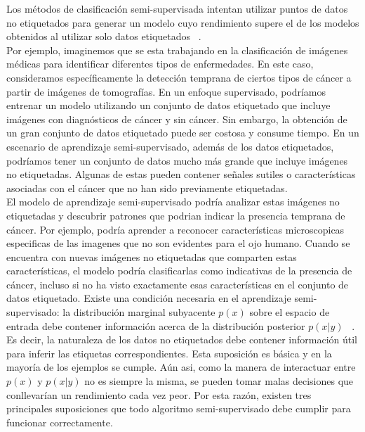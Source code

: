 Los métodos de clasificación semi-supervisada intentan utilizar puntos de datos no etiquetados para generar un modelo cuyo rendimiento supere el de los modelos obtenidos al utilizar solo datos etiquetados ~\cite{Engelen:semi-supervised}. \\Por ejemplo, imaginemos que se esta trabajando en la clasificación de imágenes médicas para identificar diferentes tipos de enfermedades. En este caso, consideramos específicamente la detección temprana de ciertos tipos de cáncer a partir de imágenes de tomografías. En un enfoque supervisado, podríamos entrenar un modelo utilizando un conjunto de datos etiquetado que incluye imágenes con diagnósticos de cáncer y sin cáncer. Sin embargo, la obtención de un gran conjunto de datos etiquetado puede ser costosa y consume tiempo. En un escenario de aprendizaje semi-supervisado, además de los datos etiquetados, podríamos tener un conjunto de datos mucho más grande que incluye imágenes no etiquetadas. Algunas de estas pueden contener señales sutiles o características asociadas con el cáncer que no han sido previamente etiquetadas.\\El modelo de aprendizaje semi-supervisado  podría analizar estas imágenes no etiquetadas y descubrir patrones que podrian indicar la presencia temprana de cáncer. Por ejemplo, podría aprender a reconocer características microscopicas especificas de las imagenes que no son evidentes para el ojo humano. Cuando se encuentra con nuevas imágenes no etiquetadas que comparten estas características, el modelo podría clasificarlas como indicativas de la presencia de cáncer, incluso si no ha visto exactamente esas características en el conjunto de datos etiquetado.
Existe una condición necesaria en el aprendizaje semi-supervisado: la distribución marginal subyacente $p(x)$ sobre el espacio de entrada debe contener información acerca de la distribución posterior $p(x|y)$ ~\cite{Engelen:semi-supervised}. Es decir, la naturaleza de los datos no etiquetados debe contener información útil para inferir las etiquetas correspondientes.
Esta suposición es básica y en la mayoría de los ejemplos se cumple. Aún asi, como la manera de interactuar entre $p(x)$ y  $p(x|y)$ no es siempre la misma, se pueden tomar malas decisiones que conllevarían un rendimiento cada vez peor. Por esta razón, existen tres principales suposiciones que todo algoritmo semi-supervisado debe cumplir para funcionar correctamente.
